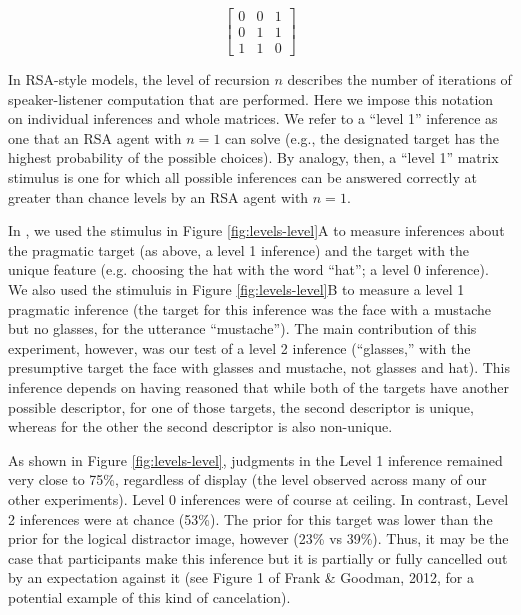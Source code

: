 \begin{equation}
\left[
    \begin{array}{ccc}
      0 & 0 & 1 \\
      0 & 1 & 1\\
      1 & 1 & 0 
    \end{array} 
  \right]
\end{equation}

\noindent In RSA-style models, the level of recursion $n$ describes the number of iterations of speaker-listener computation that are performed. Here we impose this notation on individual inferences and whole matrices. We refer to a ``level 1'' inference as one that an RSA agent with $n=1$ can solve (e.g., the designated target has the highest probability of the possible choices). By analogy, then, a ``level 1'' matrix stimulus is one for which all possible inferences can be answered correctly at greater than chance levels by an RSA agent with $n=1$. 

In , we used the stimulus in Figure \ref{fig:levels-level}A to measure inferences about the pragmatic target (as above, a level 1 inference) and the target with the unique feature (e.g. choosing the hat with the word ``hat''; a level 0 inference). We also used the stimuluis in Figure \ref{fig:levels-level}B to measure a level 1 pragmatic inference (the target for this inference was the face with a mustache but no glasses, for the utterance ``mustache''). The main contribution of this experiment, however, was our test of a level 2 inference (``glasses,'' with the presumptive target the face with glasses and mustache, not glasses and hat). This inference depends on having reasoned that while both of the targets have another possible descriptor, for one of those targets, the second descriptor is unique, whereas for the other the second descriptor is also non-unique. 

As shown in Figure \ref{fig:levels-level}, judgments in the Level 1 inference remained very close to 75\%, regardless of display (the level observed across many of our other experiments). Level 0 inferences were of course at ceiling. In contrast, Level 2 inferences were at chance (53\%). The prior for this target was lower than the prior for the logical distractor image, however (23\% vs 39\%). Thus, it may be the case that participants make this inference but it is partially or fully cancelled out by an expectation against it (see Figure 1 of Frank \& Goodman, 2012, for a potential example of this kind of cancelation). 

